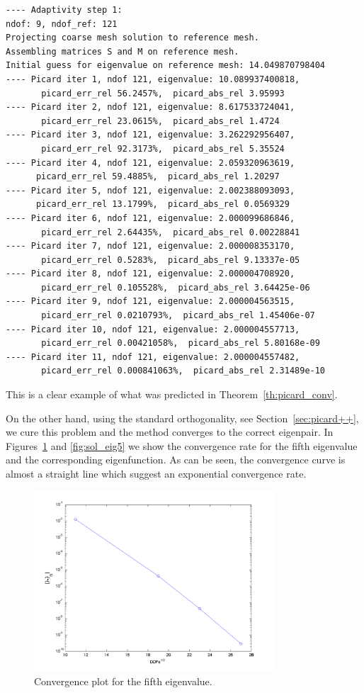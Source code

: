 \documentclass[preprint,12pt]{elsarticle}
\begin{document}
\begin{verbatim}
---- Adaptivity step 1:
ndof: 9, ndof_ref: 121
Projecting coarse mesh solution to reference mesh.
Assembling matrices S and M on reference mesh.
Initial guess for eigenvalue on reference mesh: 14.049870798404
---- Picard iter 1, ndof 121, eigenvalue: 10.089937400818, 
       picard_err_rel 56.2457%,  picard_abs_rel 3.95993
---- Picard iter 2, ndof 121, eigenvalue: 8.617533724041, 
       picard_err_rel 23.0615%,  picard_abs_rel 1.4724
---- Picard iter 3, ndof 121, eigenvalue: 3.262292956407, 
       picard_err_rel 92.3173%,  picard_abs_rel 5.35524
---- Picard iter 4, ndof 121, eigenvalue: 2.059320963619,  
      picard_err_rel 59.4885%,  picard_abs_rel 1.20297
---- Picard iter 5, ndof 121, eigenvalue: 2.002388093093, 
      picard_err_rel 13.1799%,  picard_abs_rel 0.0569329
---- Picard iter 6, ndof 121, eigenvalue: 2.000099686846, 
       picard_err_rel 2.64435%,  picard_abs_rel 0.00228841
---- Picard iter 7, ndof 121, eigenvalue: 2.000008353170, 
       picard_err_rel 0.5283%,  picard_abs_rel 9.13337e-05
---- Picard iter 8, ndof 121, eigenvalue: 2.000004708920, 
       picard_err_rel 0.105528%,  picard_abs_rel 3.64425e-06
---- Picard iter 9, ndof 121, eigenvalue: 2.000004563515, 
       picard_err_rel 0.0210793%,  picard_abs_rel 1.45406e-07
---- Picard iter 10, ndof 121, eigenvalue: 2.000004557713, 
       picard_err_rel 0.00421058%,  picard_abs_rel 5.80168e-09
---- Picard iter 11, ndof 121, eigenvalue: 2.000004557482, 
       picard_err_rel 0.000841063%,  picard_abs_rel 2.31489e-10
\end{verbatim}
This is a clear example of what was predicted in Theorem~\ref{th:picard_conv}.

On the other hand, using the standard orthogonality, see Section~\ref{sec:picard++}, we cure this problem and the method converges to the correct eigenpair. In Figures~\ref{fig:conv_eig5} and \ref{fig:sol_eig5} we show the convergence rate for  the fifth eigenvalue and the corresponding eigenfunction. As can be seen, the convergence curve is almost a straight line which suggest an exponential convergence rate.

\begin{figure}[!ht]
\begin{center}
\includegraphics[width=0.8\textwidth]{img/ex_2.png}
\end{center}
\vspace{-5mm}
\caption{Convergence plot for the fifth eigenvalue.}
\label{fig:conv_eig5}
\end{figure}
\end{document}

